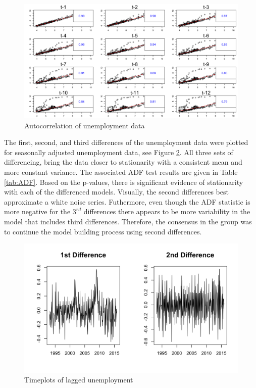 \documentclass[twoside,twocolumn]{article}
\begin{document}
		\begin{figure}[htb]
		\centering
		\caption{Autocorrelation of unemployment data}
		\label{fig:laggedunemployment}
		\includegraphics[width=\linewidth]{images/laggedunemployment}
	\end{figure}
The first, second, and third differences of the unemployment data were plotted for seasonally adjusted unemployment data, see Figure \ref{fig:seasonalunem}. All three sets of differencing, bring the data closer to stationarity with a consistent mean and more constant variance. The associated ADF test results are given in Table \ref{tab:ADF}. Based on the p-values, there is significant evidence of stationarity with each of the differenced models. Visually, the second differences best approximate a white noise series. Futhermore, even though the ADF statistic is more negative for the \(3^{rd}\) differences there appears to be more variability in the model that includes third differences.  Therefore, the consensus in the group was to continue the model building process using second differences.
	\begin{figure}[htb]
		\centering
		\caption{Timeplots of lagged unemployment}
		\label{fig:seasonalunem}
		\includegraphics[width=\linewidth]{images/seasonalunem}
	\end{figure}
		 
\end{document}
